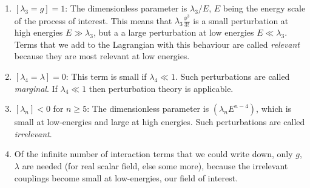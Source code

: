 \begin{enumerate}
	\item $[\lambda_3=g]=1$: The dimensionless parameter is $\lambda_3/E$, $E$ being the energy scale of the process of interest. This means that $\lambda_3 \frac{\phi^3}{3!}$ is a small perturbation at high energies $E\gg \lambda_3$, but a a large perturbation at low energies $E\ll \lambda_3$. Terms that we add to the Lagrangian with this behaviour are called \emph{relevant} because they are most relevant at low energies.
	\item $[\lambda_4=\lambda]=0$: This term is small if $\lambda_4 \ll 1$. Such perturbations are called \emph{marginal}. If $\lambda_4 \ll1$ then perturbation theory is applicable.
	\item $[\lambda_n]<0$ for $n\geq 5$: The dimensionless parameter is $(\lambda_n E^{n-4})$, which is small at low-energies and large at high energies. Such perturbations are called \emph{irrelevant}.
	\item Of the infinite number of interaction terms that we could write down, only $g$,$\lambda$ are needed (for real scalar field, else some more), because the irrelevant couplings become small at low-energies, our field of interest.
\end{enumerate}

